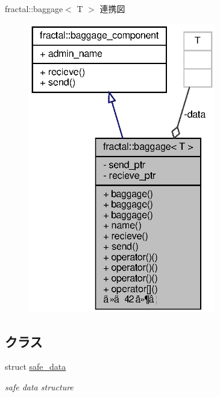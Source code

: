fractal\+:\+:baggage$<$ T $>$ 連携図
\nopagebreak
\begin{figure}[H]
\begin{center}
\leavevmode
\includegraphics[width=232pt]{classfractal_1_1baggage__coll__graph}
\end{center}
\end{figure}
\subsection*{クラス}
\begin{DoxyCompactItemize}
\item 
struct \hyperlink{structfractal_1_1baggage_1_1safe__data}{safe\+\_\+data}
\begin{DoxyCompactList}\small\item\em safe data structure \end{DoxyCompactList}\end{DoxyCompactItemize}

